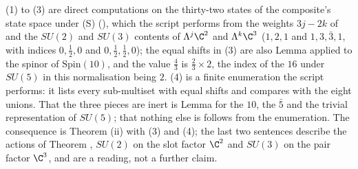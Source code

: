(1) to (3) are direct computations on the thirty-two states of the composite's state space under (S) (), which the script performs from the weights $3j - 2k$ of  and the $SU(2)$ and $SU(3)$ contents of $\Lambda^{j}\C^{2}$ and $\Lambda^{k}\C^{3}$ ($1, 2, 1$ and $1, 3, \bar{3}, 1$, with indices $0, \tfrac12, 0$ and $0, \tfrac12, \tfrac12, 0$); the equal shifts in (3) are also Lemma  applied to the spinor of $\mathrm{Spin}(10)$, and the value $\tfrac43$ is $\tfrac23 \times 2$, the index of the $16$ under $SU(5)$ in this normalisation being $2$. (4) is a finite enumeration the script performs: it lists every sub-multiset with equal shifts and compares with the eight unions. That the three pieces are inert is Lemma  for the $10$, the $\bar{5}$ and the trivial representation of $SU(5)$; that nothing else is follows from the enumeration. The consequence is Theorem (ii) with (3) and (4); the last two sentences describe the actions of Theorem , $SU(2)$ on the slot factor $\C^{2}$ and $SU(3)$ on the pair factor $\C^{3}$, and are a reading, not a further claim.
